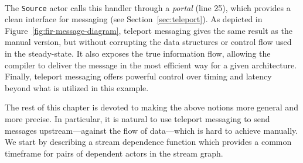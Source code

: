 %
\addtocounter{page}{-3}
\clearpage
\noindent\mbox{~}\hspace{-1.05in}\parbox{8.5in}{\vspace{-0.9in}}
\clearpage
%
\noindent The {\tt Source} actor calls this handler through a
{\it portal} (line 25), which provides a clean interface for messaging
(see Section~\ref{sec:teleport}).  As depicted in
Figure~\ref{fig:fir-message-diagram}, teleport messaging gives the
same result as the manual version, but without corrupting the data
structures or control flow used in the steady-state.  It also exposes
the true information flow, allowing the compiler to deliver the
message in the most efficient way for a given architecture.  Finally,
teleport messaging offers powerful control over timing and latency
beyond what is utilized in this example.

The rest of this chapter is devoted to making the above notions more
general and more precise.  In particular, it is natural to use
teleport messaging to send messages upstream---against the flow of
data---which is hard to achieve manually.  We start by describing a
stream dependence function which provides a common timeframe for pairs
of dependent actors in the stream graph.

